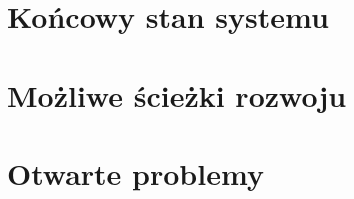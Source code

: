 \documentclass[../praca-dyplomowa.tex]{subfiles}
\begin{document}
\section{Końcowy stan systemu}


\section{Możliwe ścieżki rozwoju}


\section{Otwarte problemy}

\end{document}
